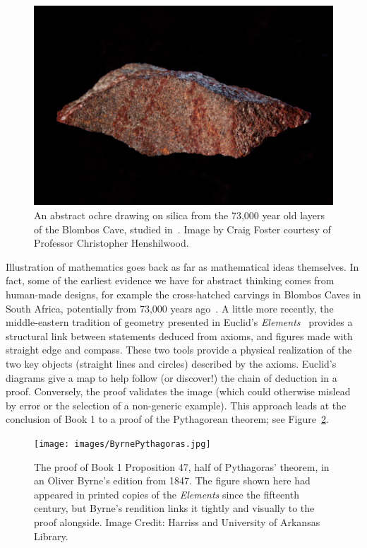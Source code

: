 \documentclass{notices}
\begin{document}
\begin{figure}
    \includegraphics[width=1.\linewidth]{images/Blombos_Cave_HiRes.jpg}
    \caption{An abstract ochre drawing on silica from the 73,000 year old layers of the Blombos Cave, studied in~\cite{Henshilwood:ADF7LBCSA}. 
    Image by Craig Foster courtesy of Professor Christopher Henshilwood.}
    \label{fig:BlombasStone}
\end{figure}

Illustration of mathematics goes back as far as mathematical ideas themselves. In fact, some of the earliest evidence we have for abstract thinking comes from human-made designs, for example the cross-hatched carvings in Blombos Caves in South Africa, potentially from 73,000 years ago~\cite{Henshilwood:ADF7LBCSA}. 
A little more recently, the middle-eastern tradition of geometry presented in Euclid's \emph{Elements}~\cite{Euclid:EE}
provides a structural link between statements deduced from axioms, and figures made with straight edge and compass.  These two tools provide a physical realization of the two key objects (straight lines and circles) described by the axioms. Euclid's diagrams give a map to help follow (or discover!) the chain of deduction in a proof.  Conversely, the proof validates the image (which could otherwise mislead by error or the selection of a non-generic example).
This approach leads at the conclusion of Book 1 to a proof of the Pythagorean theorem; see Figure~\ref{fig:Pythagoras}.

\begin{figure}
    \texttt{[image: images/ByrnePythagoras.jpg]}
    \caption{The proof of Book 1 Proposition 47, half of Pythagoras' theorem, in an Oliver Byrne's edition from 1847. The figure shown here had appeared in printed copies of the \emph{Elements} since the fifteenth century, but Byrne's rendition links it tightly and visually to the proof alongside. Image Credit: Harriss and University of Arkansas Library.}
    \label{fig:Pythagoras}
\end{figure}
\end{document}
